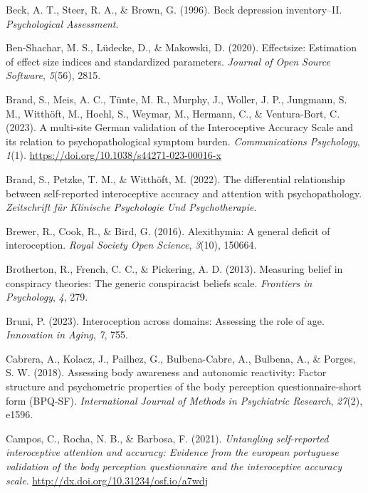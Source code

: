 \documentclass[
  jou,
  floatsintext,
  longtable,
  nolmodern,
  notxfonts,
  notimes,
  colorlinks=true,linkcolor=blue,citecolor=blue,urlcolor=blue]{apa7}
\newlength{\cslhangindent}
\newenvironment{CSLReferences}[2] %
 {\begin{list}{}{%
  \setlength{\itemindent}{0pt}
  \setlength{\leftmargin}{0pt}
  \setlength{\parsep}{0pt}
  \ifodd #1
   \setlength{\leftmargin}{\cslhangindent}
   \setlength{\itemindent}{-1\cslhangindent}
  \fi
  \setlength{\itemsep}{#2\baselineskip}}}
 {\end{list}}
\begin{document}
\begin{CSLReferences}{1}{0}
Beck, A. T., Steer, R. A., \& Brown, G. (1996). Beck depression
inventory--II. \emph{Psychological Assessment}.

Ben-Shachar, M. S., Lüdecke, D., \& Makowski, D. (2020). Effectsize:
Estimation of effect size indices and standardized parameters.
\emph{Journal of Open Source Software}, \emph{5}(56), 2815.

Brand, S., Meis, A. C., Tünte, M. R., Murphy, J., Woller, J. P.,
Jungmann, S. M., Witthöft, M., Hoehl, S., Weymar, M., Hermann, C., \&
Ventura-Bort, C. (2023). A multi-site German validation of the
Interoceptive Accuracy Scale and its relation to psychopathological
symptom burden. \emph{Communications Psychology}, \emph{1}(1).
\url{https://doi.org/10.1038/s44271-023-00016-x}

Brand, S., Petzke, T. M., \& Witthöft, M. (2022). The differential
relationship between self-reported interoceptive accuracy and attention
with psychopathology. \emph{Zeitschrift f{ü}r Klinische Psychologie Und
Psychotherapie}.

Brewer, R., Cook, R., \& Bird, G. (2016). Alexithymia: A general deficit
of interoception. \emph{Royal Society Open Science}, \emph{3}(10),
150664.

Brotherton, R., French, C. C., \& Pickering, A. D. (2013). Measuring
belief in conspiracy theories: The generic conspiracist beliefs scale.
\emph{Frontiers in Psychology}, \emph{4}, 279.

Bruni, P. (2023). Interoception across domains: Assessing the role of
age. \emph{Innovation in Aging}, \emph{7}, 755.

Cabrera, A., Kolacz, J., Pailhez, G., Bulbena-Cabre, A., Bulbena, A., \&
Porges, S. W. (2018). Assessing body awareness and autonomic reactivity:
Factor structure and psychometric properties of the body perception
questionnaire-short form (BPQ-SF). \emph{International Journal of
Methods in Psychiatric Research}, \emph{27}(2), e1596.

Campos, C., Rocha, N. B., \& Barbosa, F. (2021). \emph{Untangling
self-reported interoceptive attention and accuracy: Evidence from the
european portuguese validation of the body perception questionnaire and
the interoceptive accuracy scale}.
\url{http://dx.doi.org/10.31234/osf.io/a7wdj}


\end{CSLReferences}
\end{document}

